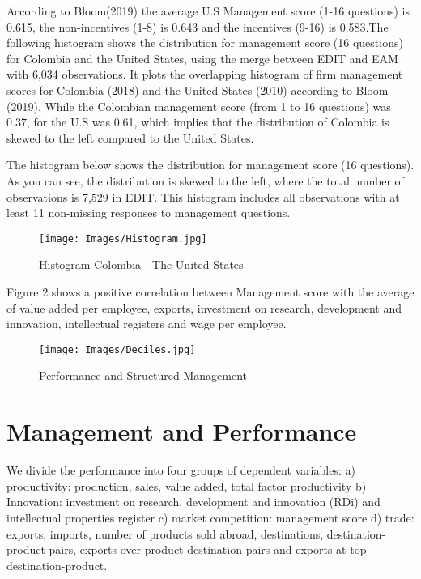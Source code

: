 \documentclass{article}
\begin{document}
According to Bloom(2019) the average U.S Management score (1-16 questions) is 0.615, the non-incentives (1-8) is 0.643 and the incentives (9-16) is 0.583.The following histogram shows the distribution for management score (16 questions) for Colombia and the United States, using the merge between EDIT and EAM with 6,034 observations. It plots the overlapping histogram of firm management scores for Colombia (2018) and the United States (2010) according to Bloom (2019). While the Colombian management score (from 1 to 16 questions) was 0.37, for the U.S was 0.61, which implies that the distribution of Colombia is skewed to the left compared to the United States.

The histogram below shows the distribution for management score (16 questions). As you can see, the distribution is skewed to the left, where the total number of observations is 7,529 in EDIT. This histogram includes all observations with at least 11 non-missing responses to management questions.

\begin{figure}
	\caption{Histogram Colombia - The United States}
    \centering
	\texttt{[image: Images/Histogram.jpg]}
\end{figure}
\doublespacing

Figure 2 shows a positive correlation between Management score with the average of value added per employee, exports, investment on research, development and innovation, intellectual registers and wage per employee.


\begin{figure}
    \caption{Performance and Structured Management}
    \centering
    \texttt{[image: Images/Deciles.jpg]}
\end{figure}

\doublespacing

\section{Management and Performance}

We divide the performance into four groups of dependent variables: a) productivity: production, sales, value added, total factor productivity b) Innovation: investment on research, development and innovation (RDi) and intellectual properties register c) market competition: management score d) trade: exports, imports, number of products sold abroad, destinations, destination-product pairs, exports over product destination pairs and exports at top destination-product.
\end{document}
